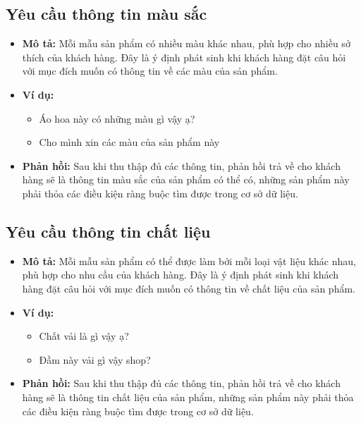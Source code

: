 \subsection{Yêu cầu thông tin màu sắc}
\begin{itemize}
    \item \textbf{Mô tả:} Mỗi mẫu sản phẩm có nhiều màu khác nhau,
    phù hợp cho nhiều sở thích của khách hàng. Đây là ý định
    phát sinh khi khách hàng đặt câu hỏi với mục đích muốn có
    thông tin về các màu của sản phẩm.
    \item \textbf{Ví dụ:}
    \begin{itemize}
        \item Áo hoa này có những màu gì vậy ạ?
        \item Cho mình xin các màu của sản phẩm này
    \end{itemize}
    \item \textbf{Phản hồi:} Sau khi thu thập đủ các thông tin,
    phản hồi trả về cho khách hàng sẽ là thông tin màu sắc của
    sản phẩm có thể có, những sản phẩm này phải thỏa các điều kiện
    ràng buộc tìm được trong cơ sở dữ liệu.
\end{itemize}

\subsection{Yêu cầu thông tin chất liệu}
\begin{itemize}
    \item \textbf{Mô tả:} Mỗi mẫu sản phẩm có thể được làm bởi mỗi
    loại vật liệu khác nhau, phù hợp cho nhu cầu của khách hàng.
    Đây là ý định phát sinh khi khách hàng đặt câu hỏi với mục đích
    muốn có thông tin về chất liệu của sản phẩm.
    \item \textbf{Ví dụ:}
    \begin{itemize}
        \item Chất vải là gì vậy ạ?
        \item Đầm này vải gì vậy shop?
    \end{itemize}
    \item \textbf{Phản hồi:} Sau khi thu thập đủ các thông tin,
    phản hồi trả về cho khách hàng sẽ là thông tin chất liệu của
    sản phẩm, những sản phẩm này phải thỏa các điều kiện ràng buộc
    tìm được trong cơ sở dữ liệu.
\end{itemize}

